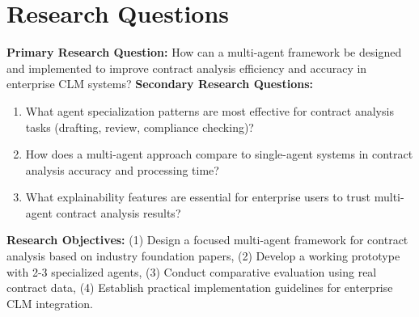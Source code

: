 
\section{Research Questions}\label{section:research_questions}

\textbf{Primary Research Question:} How can a multi-agent framework be designed and implemented to improve contract analysis efficiency and accuracy in enterprise CLM systems?
\newline
\break
\textbf{Secondary Research Questions:}
\begin{enumerate}
    \item What agent specialization patterns are most effective for contract analysis tasks (drafting, review, compliance checking)?
    \item How does a multi-agent approach compare to single-agent systems in contract analysis accuracy and processing time?
    \item What explainability features are essential for enterprise users to trust multi-agent contract analysis results?
\end{enumerate}



\textbf{Research Objectives:} (1) Design a focused multi-agent framework for contract analysis based on industry foundation papers, (2) Develop a working prototype with 2-3 specialized agents, (3) Conduct comparative evaluation using real contract data, (4) Establish practical implementation guidelines for enterprise CLM integration.
